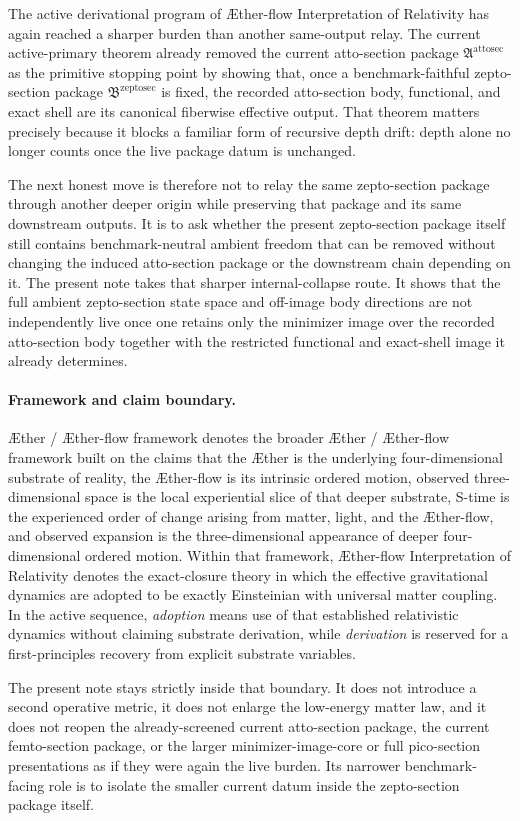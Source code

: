 \documentclass[11pt]{article}
\newcommand{\Aether}{\AE{}ther}
\newcommand{\Aflow}{\AE{}ther-flow}
\newcommand{\TheoryName}{\Aflow{} Interpretation of Relativity}
\newcommand{\TheoryProgram}{\Aether{} / \Aflow{} framework}
\newcommand{\AttoSectionPackage}{\mathfrak A^{\mathrm{attosec}}}
\newcommand{\ZeptoSectionPackage}{\mathfrak B^{\mathrm{zeptosec}}}
\begin{document}
The active derivational program of \TheoryName{} has again reached a sharper burden than another same-output relay. The current active-primary theorem already removed the current atto-section package \(\AttoSectionPackage\) as the primitive stopping point by showing that, once a benchmark-faithful zepto-section package \(\ZeptoSectionPackage\) is fixed, the recorded atto-section body, functional, and exact shell are its canonical fiberwise effective output. That theorem matters precisely because it blocks a familiar form of recursive depth drift: depth alone no longer counts once the live package datum is unchanged.

The next honest move is therefore not to relay the same zepto-section package through another deeper origin while preserving that package and its same downstream outputs. It is to ask whether the present zepto-section package itself still contains benchmark-neutral ambient freedom that can be removed without changing the induced atto-section package or the downstream chain depending on it. The present note takes that sharper internal-collapse route. It shows that the full ambient zepto-section state space and off-image body directions are not independently live once one retains only the minimizer image over the recorded atto-section body together with the restricted functional and exact-shell image it already determines.

\paragraph{Framework and claim boundary.}
\TheoryProgram{} denotes the broader \Aether{} / \Aflow{} framework built on the claims that the \Aether{} is the underlying four-dimensional substrate of reality, the \Aflow{} is its intrinsic ordered motion, observed three-dimensional space is the local experiential slice of that deeper substrate, S-time is the experienced order of change arising from matter, light, and the \Aflow{}, and observed expansion is the three-dimensional appearance of deeper four-dimensional ordered motion. Within that framework, \TheoryName{} denotes the exact-closure theory in which the effective gravitational dynamics are adopted to be exactly Einsteinian with universal matter coupling. In the active sequence, \emph{adoption} means use of that established relativistic dynamics without claiming substrate derivation, while \emph{derivation} is reserved for a first-principles recovery from explicit substrate variables.

The present note stays strictly inside that boundary. It does not introduce a second operative metric, it does not enlarge the low-energy matter law, and it does not reopen the already-screened current atto-section package, the current femto-section package, or the larger minimizer-image-core or full pico-section presentations as if they were again the live burden. Its narrower benchmark-facing role is to isolate the smaller current datum inside the zepto-section package itself.
\end{document}
